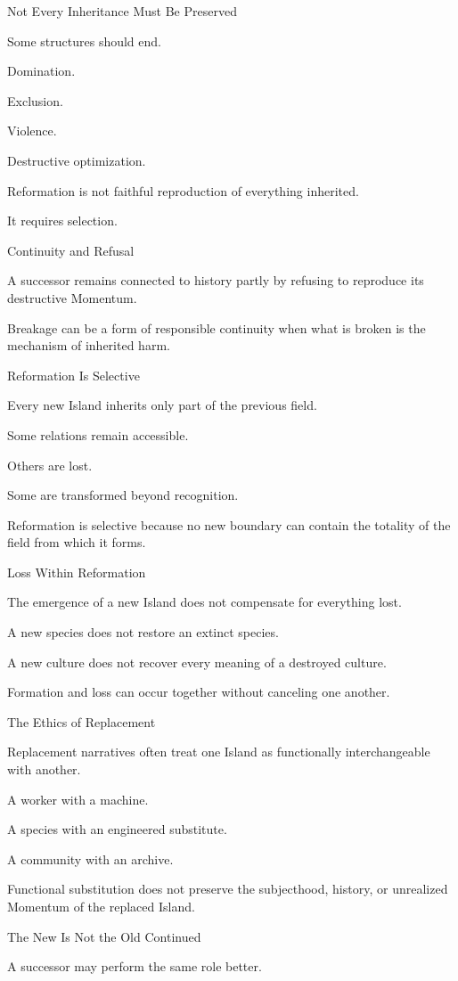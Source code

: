 Not Every Inheritance Must Be Preserved

Some structures should end.

Domination.

Exclusion.

Violence.

Destructive optimization.

Reformation is not faithful reproduction of everything inherited.

It requires selection.

Continuity and Refusal

A successor remains connected to history partly by refusing to reproduce its destructive Momentum.

Breakage can be a form of responsible continuity when what is broken is the mechanism of inherited harm.

Reformation Is Selective

Every new Island inherits only part of the previous field.

Some relations remain accessible.

Others are lost.

Some are transformed beyond recognition.

Reformation is selective because no new boundary can contain the totality of the field from which it forms.

Loss Within Reformation

The emergence of a new Island does not compensate for everything lost.

A new species does not restore an extinct species.

A new culture does not recover every meaning of a destroyed culture.

Formation and loss can occur together without canceling one another.

The Ethics of Replacement

Replacement narratives often treat one Island as functionally interchangeable with another.

A worker with a machine.

A species with an engineered substitute.

A community with an archive.

Functional substitution does not preserve the subjecthood, history, or unrealized Momentum of the replaced Island.

The New Is Not the Old Continued

A successor may perform the same role better.

